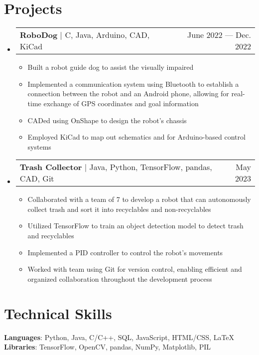 \documentclass[letterpaper,11pt]{article}
\makeatletter
\newcommand{\resumeItem}[1]{
  \item\small{
    {#1 \vspace{-2pt}}
  }
}
\newcommand{\resumeProjectHeading}[2]{
    \item
    \begin{tabular*}{0.97\textwidth}{l@{\extracolsep{\fill}}r}
      \small#1 & #2 \\
    \end{tabular*}\vspace{-7pt}
}
\newcommand{\resumeSubHeadingListStart}{\begin{itemize}[leftmargin=0.15in, label={}]}
\newcommand{\resumeSubHeadingListEnd}{\end{itemize}}
\newcommand{\resumeItemListStart}{\begin{itemize}}
\newcommand{\resumeItemListEnd}{\end{itemize}\vspace{-5pt}}
\makeatother
\begin{document}
\section{Projects}
    \resumeSubHeadingListStart
      \resumeProjectHeading
          {\textbf{RoboDog} $|$ {C, Java, Arduino, CAD, KiCad}}{June 2022 --- Dec. 2022}
          \resumeItemListStart
            \resumeItem{Built a robot guide dog to assist the visually impaired}
            \resumeItem{Implemented a communication system using Bluetooth to establish a connection between the robot and an Android phone, allowing for real-time exchange of GPS coordinates and goal information}
            \resumeItem{CADed using OnShape to design the robot's chassis}
            \resumeItem{Employed KiCad to map out schematics and for Arduino-based control systems}
          \resumeItemListEnd
      \resumeProjectHeading
          {\textbf{Trash Collector} $|$ {Java, Python, TensorFlow, pandas, CAD, Git}}{May 2023}
          \resumeItemListStart
            \resumeItem{Collaborated with a team of 7 to develop a robot that can autonomously collect trash and sort it into recyclables and non-recyclables}
            \resumeItem{Utilized TensorFlow to train an object detection model to detect trash and recyclables}
            \resumeItem{Implemented a PID controller to control the robot's movements}
            \resumeItem{Worked with team using Git for version control, enabling efficient and organized collaboration throughout the development process}
          \resumeItemListEnd
    \resumeSubHeadingListEnd



%
\section{Technical Skills}
 \begin{itemize}[leftmargin=0.15in, label={}]
    \small{\item{
     \textbf{Languages}{: Python, Java, C/C++, SQL, JavaScript, HTML/CSS, LaTeX} \\
     \textbf{Libraries}{: TensorFlow, OpenCV, pandas, NumPy, Matplotlib, PIL}
    }}
 \end{itemize}


\end{document}
